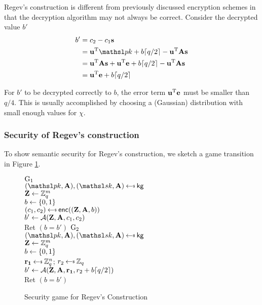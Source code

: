 \noindent Regev's construction is different from previously discussed encryption schemes in that the decryption algorithm may not always be correct. Consider the decrypted value $b'$ 
\begin{align*}
b'  &= c_2 - c_1 \varvect{s}\\
    &= \varvect{u}^{\textnormal{T}} \pk + b \lceil q/2 \rceil - \varvect{u}^{\textnormal{T}} \varvect{A}\varvect{s}\\
    &= \varvect{u}^{\textnormal{T}}\varvect{A}\varvect{s} + \varvect{u}^{\textnormal{T}}\varvect{e} + b \lceil q/2 \rceil - \varvect{u}^{\textnormal{T}} \varvect{A}\varvect{s}\\
    &= \varvect{u}^{\textnormal{T}}\varvect{e} + b \lceil q/2 \rceil
\end{align*}

\noindent For $b'$ to be decrypted correctly to $b$, the error term $\mathbf{u}^{\textnormal{T}}\mathbf{e}$ must be smaller than $q/4$. This is usually accomplished by choosing a (Gaussian) distribution with small enough values for $\chi$.

\subsubsection{Security of Regev's construction}

To show semantic security for Regev's construction, we sketch a game transition in Figure \ref{fig: Security Regev}.

\begin{figure}[h]
\centering
{}
{
    \underline{${{\textnormal G}}_1$}\\[1pt]
    $(\pk,\varvect{A}),(\sk, \varvect{A}) \getsr \kg$\\
    $\mathbf{Z} \gets {{\mathbb Z}}_q^m$\\
    $b \gets \{0,1\}$\\
    $(c_1, c_2) \getsr \enc((\varvect{Z}, \varvect{A}, b))$\\
    $b' \gets {\mathcal A}(\mathbf{Z}, \mathbf{A}, c_1, c_2)$\\
    Ret $(b = b')$
}
{
    \underline{${{\textnormal G}}_2$}\\[1pt]
    $(\pk,\varvect{A}),(\sk, \varvect{A}) \getsr \kg$\\
    $\mathbf{Z} \gets {{\mathbb Z}}_q^m$\\
    $b \gets \{0,1\}$\\
    $\varvect{r_1} \getsr \Z_q^n$; $r_2 \getsr \Z_q$\\
    $b' \gets {\mathcal A}(\mathbf{Z}, \mathbf{A}, \mathbf{r_1}, r_2 + b \lceil q/2 \rceil)$\\
    Ret $(b = b')$
}
\caption{Security game for Regev's Construction}
\label{fig: Security Regev}
\end{figure}

